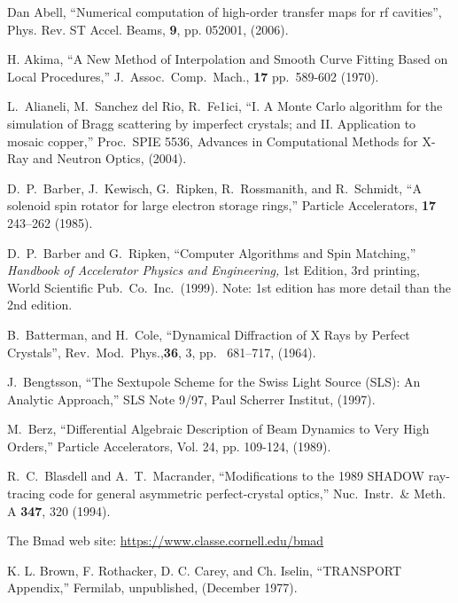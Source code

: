 \begin{thebibliography}{XXXXXXX99}

Dan Abell, ``Numerical computation of high-order transfer maps for rf cavities'',
Phys. Rev. ST Accel. Beams, {\bf 9}, pp. 052001, (2006).

H. Akima, 
``A New Method of Interpolation and Smooth Curve Fitting Based on Local Procedures,'' 
J.\ Assoc.\ Comp.\ Mach., {\bf 17} pp.~589-602 (1970).

L.~Alianeli, M.~Sanchez del Rio, R.~Fe1ici,
``I. A Monte Carlo algorithm for the simulation of Bragg scattering by imperfect crystals; 
and II. Application to mosaic copper,''
Proc.~SPIE 5536, Advances in Computational Methods for X-Ray and Neutron Optics, (2004).

D.\ P.\ Barber, J.\ Kewisch, G.\ Ripken, R.\ Rossmanith, and R.\ Schmidt,
``A solenoid spin rotator for large electron storage rings,''
Particle Accelerators, {\bf 17} 243–262 (1985).

D.~P.~Barber and G.~Ripken,
``Computer Algorithms and Spin Matching,''
{\it Handbook of Accelerator Physics and Engineering,}
1st Edition, 3rd printing, World Scientific Pub.\ Co.\ Inc.\ (1999).
Note: 1st edition has more detail than the 2nd edition.

B.~Batterman, and H.~Cole,
``Dynamical Diffraction of X Rays by Perfect Crystals'',
Rev.\ Mod.\ Phys.,{\bf 36}, 3, pp.~ 681--717, (1964).

J.~Bengtsson,
``The Sextupole Scheme for the Swiss Light Source (SLS): An Analytic Approach,''
SLS Note 9/97, Paul Scherrer Institut, (1997).

M.~Berz, 
``Differential Algebraic Description of Beam Dynamics to Very High Orders,''
Particle Accelerators, Vol. 24, pp. 109-124, (1989).

R.~C.~Blasdell and A.~T.~Macrander, 
``Modifications to the 1989 SHADOW ray-tracing code for general asymmetric perfect-crystal optics,''
Nuc.\ Instr.\ \& Meth. A {\bf 347}, 320 (1994).

The Bmad web site:
\hfill\break
\hspace*{0.3in} \url{https://www.classe.cornell.edu/bmad}

K. L. Brown, F. Rothacker, D. C. Carey, and Ch. Iselin, 
``TRANSPORT Appendix,'' 
Fermilab, unpublished, (December 1977).


\end{thebibliography}
